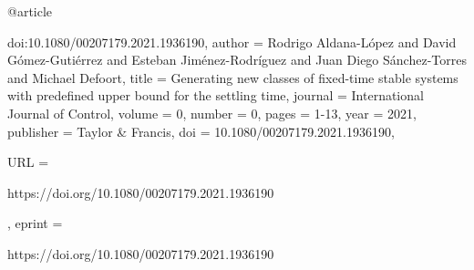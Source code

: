 






@article{doi:10.1080/00207179.2021.1936190,
author = {Rodrigo Aldana-López and David Gómez-Gutiérrez and Esteban Jiménez-Rodríguez and Juan Diego Sánchez-Torres and Michael Defoort},
title = {Generating new classes of fixed-time stable systems with predefined upper bound for the settling time},
journal = {International Journal of Control},
volume = {0},
number = {0},
pages = {1-13},
year  = {2021},
publisher = {Taylor & Francis},
doi = {10.1080/00207179.2021.1936190},

URL = { 
        https://doi.org/10.1080/00207179.2021.1936190
    
},
eprint = { 
        https://doi.org/10.1080/00207179.2021.1936190
    
}

}


